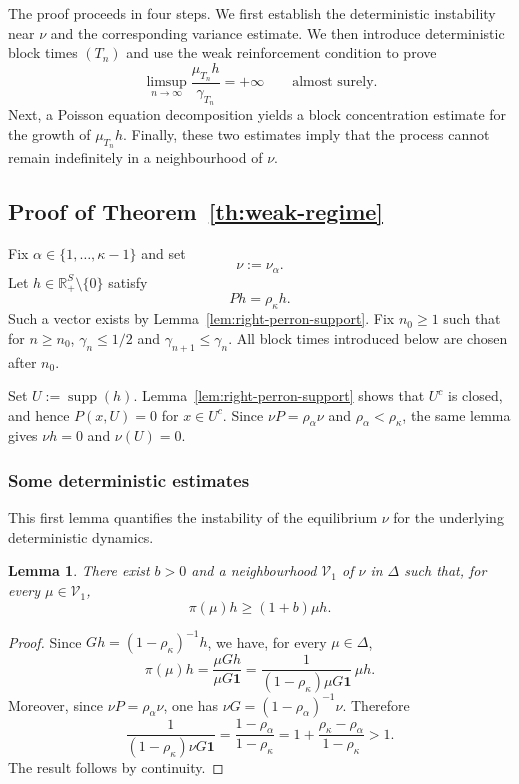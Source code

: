 \documentclass[10pt,letterpaper]{article}
\theoremstyle{compactplain}
\newtheorem{lemma}[theorem]{Lemma}
\theoremstyle{compactdefinition}
\DeclareMathOperator{\supp}{supp}
\newcommand{\1}{\mathds{1}}
\begin{document}
The proof proceeds in four steps. We first establish the deterministic
instability near \(\nu\) and the corresponding variance estimate. We then
introduce deterministic block times \((T_n)\) and use the weak reinforcement
condition to prove
\[
\limsup_{n\to\infty}
\frac{\mu_{T_n}h}{\gamma_{T_n}}
=
+\infty
\qquad\text{almost surely}.
\]
Next, a Poisson equation decomposition yields a block concentration estimate
for the growth of \(\mu_{T_n}h\). Finally, these two estimates imply that the
process cannot remain indefinitely in a neighbourhood of \(\nu\).


\subsection{Proof of Theorem~\ref{th:weak-regime}}

Fix \(\alpha\in\{1,\ldots,\kappa-1\}\) and set 
\[
\nu:=\nu_\alpha.\] 
Let \(h\in\mathbb R_+^S\setminus\{0\}\) satisfy
\[
Ph=\rho_\kappa h.
\]
Such a vector exists by Lemma~\ref{lem:right-perron-support}.
Fix \(n_0\geq1\) such that for $n\geq n_0$, \(\gamma_n \leq 1/2\) and \(\gamma_{n+1}\leq\gamma_n\).
All block times introduced below are chosen after \(n_0\).


Set \(U:=\supp(h)\). Lemma~\ref{lem:right-perron-support} shows that
\(U^c\) is closed, and hence \(P(x,U)=0\) for \(x\in U^c\). Since
\(\nu P=\rho_\alpha\nu\) and \(\rho_\alpha<\rho_\kappa\), the same lemma gives \(\nu h=0\) and \(\nu(U)=0.\)




\subsubsection{Some deterministic estimates}

This first lemma quantifies the instability of the equilibrium \(\nu\) for the
underlying deterministic dynamics.

\begin{lemma}
\label{lemma:deterministic}
There exist \(b>0\) and a neighbourhood \(\mathcal V_1\) of \(\nu\) in \(\Delta\) such that,
for every \(\mu\in\mathcal V_1\),
\[
\pi(\mu)h\geq (1+b)\mu h.
\]
\end{lemma}

\begin{proof}
Since \(Gh=(1-\rho_\kappa)^{-1}h\), we have, for every \(\mu\in\Delta\),
\[
\pi(\mu)h
=
\frac{\mu Gh}{\mu G\mathbf 1}
=
\frac{1}{(1-\rho_\kappa)\mu G\mathbf 1}\,\mu h.
\]
Moreover, since \(\nu P=\rho_\alpha\nu\), one has
\(\nu G=(1-\rho_\alpha)^{-1}\nu\). Therefore
\[
\frac{1}{(1-\rho_\kappa)\nu G\mathbf 1}
=
\frac{1-\rho_\alpha}{1-\rho_\kappa}
=
1+\frac{\rho_\kappa-\rho_\alpha}{1-\rho_\kappa}
>
1.
\]
The result follows by continuity. 
\end{proof}
\end{document}
